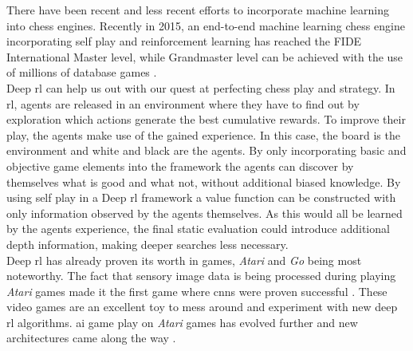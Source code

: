 There have been recent and less recent efforts to incorporate machine learning into chess engines. Recently in 2015, an end-to-end machine learning chess engine incorporating self play and reinforcement learning has reached the FIDE International Master level, while Grandmaster level can be achieved with the use of millions of database games \cite{giraffe15,deepchess16}. \\

Deep \gls{rl} can help us out with our quest at perfecting chess play and strategy. In \gls{rl}, agents are released in an environment where they have to find out by exploration which actions generate the best cumulative rewards. To improve their play, the agents make use of the gained experience. In this case, the board is the environment and white and black are the agents. By only incorporating basic and objective game elements into the framework the agents can discover by themselves what is good and what not, without additional biased knowledge. By using self play in a Deep \gls{rl} framework a value function can be constructed with only information observed by the agents themselves. As this would all be learned by the agents experience, the final static evaluation could introduce additional depth information, making deeper searches less necessary. \\


Deep \gls{rl} has already proven its worth in games, \textit{Atari} and \textit{Go} being most noteworthy. The fact that sensory image data is being processed during playing \textit{Atari} games made it the first game where \glspl{cnn} were proven successful \cite{silv13}. These video games are an excellent toy to mess around and experiment with new deep \gls{rl} algorithms. \gls{ai} game play on \textit{Atari} games has evolved further and new architectures came along the way \cite{dddqn15}.\\


